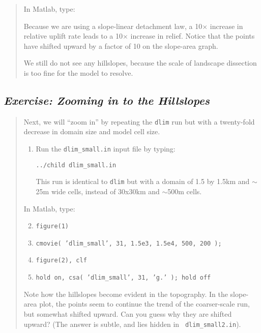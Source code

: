 \documentclass[12pt,reqno]{amsart}
\begin{document}
\begin{quote}
{In Matlab, type:

Because we are using a slope-linear detachment law, a 10$\times$ increase in relative uplift rate leads to a 10$\times$ increase in relief. Notice that the points have shifted upward by a factor of 10 on the slope-area graph.

We still do not see any hillslopes, because the scale of landscape
dissection is too fine for the model to resolve. 
}
\end{quote}

\subsection*{\em Exercise: Zooming in to the Hillslopes}

\begin{quote}
\small
{\sf
Next, we will ``zoom in'' by repeating the {\tt dlim} run but with a twenty-fold decrease
in domain size and model cell size.

\begin{enumerate}
\item
Run the {\tt dlim\_small.in} input file by typing:

{\tt ../child dlim\_small.in}

This run is identical to {\tt dlim} but with a domain of 1.5 by 1.5km
and $\sim$25m wide cells, instead of 30x30km and $\sim$500m cells.
\end{enumerate}

\noindent 
In Matlab, type:
\begin{enumerate}
\setcounter{enumi}{1}
\item
{\tt figure(1)}
\item
{\tt cmovie( 'dlim\_small', 31, 1.5e3, 1.5e4, 500, 200 );}
\item
{\tt figure(2), clf}
\item
{\tt hold on, csa( 'dlim\_small', 31, 'g.' ); hold off}
\end{enumerate}

Note how the hillslopes become evident in the topography. In the
slope-area plot, the points seem to continue the trend of the
coarser-scale run, but somewhat shifted upward. Can you guess why they
are shifted upward? (The answer is subtle, and lies hidden in {\tt
  dlim\_small2.in}).
}
\end{quote}
\end{document}
